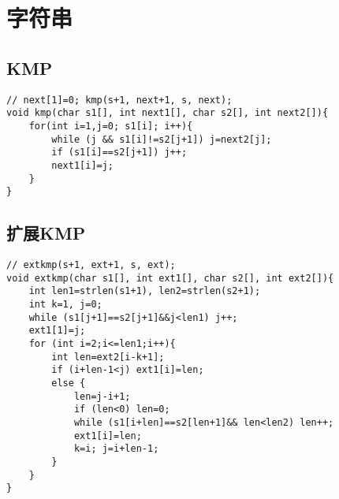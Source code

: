 \documentclass{article}
\begin{document}
\section{字符串}

\subsection{KMP}
\begin{lstlisting}
// next[1]=0; kmp(s+1, next+1, s, next);
void kmp(char s1[], int next1[], char s2[], int next2[]){
	for(int i=1,j=0; s1[i]; i++){
        while (j && s1[i]!=s2[j+1]) j=next2[j];
        if (s1[i]==s2[j+1]) j++;
        next1[i]=j;
    }
}
\end{lstlisting}

\subsection{扩展KMP}
\begin{lstlisting}
// extkmp(s+1, ext+1, s, ext);
void extkmp(char s1[], int ext1[], char s2[], int ext2[]){
	int len1=strlen(s1+1), len2=strlen(s2+1);
	int k=1, j=0;
	while (s1[j+1]==s2[j+1]&&j<len1) j++;
	ext1[1]=j;
	for (int i=2;i<=len1;i++){
		int len=ext2[i-k+1];
		if (i+len-1<j) ext1[i]=len;
		else {
			len=j-i+1;
			if (len<0) len=0;
			while (s1[i+len]==s2[len+1]&& len<len2) len++;
			ext1[i]=len;
			k=i; j=i+len-1;
		}
	}
}
\end{lstlisting}
\end{document}
